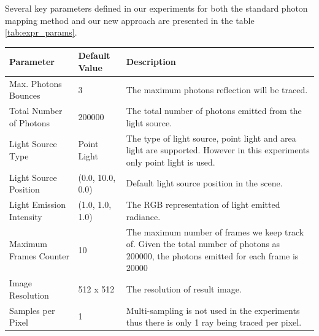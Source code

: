 Several key parameters defined in our experiments for both the standard photon mapping method and our new approach are presented in the table \ref{tab:expr_params}.

\begin{table}[Ht]
\begin{center}
	
	\renewcommand{\arraystretch}{1.2}
	\begin{tabular}{p{5cm}p{3cm}p{5cm}}
	
	Parameter  				& 		Default Value 		&		Description \\
	
	\hline

	Max. Photons Bounces		& 		3					&		The maximum photons reflection will be traced. \\

	\hline 					

	Total Number of Photons 	& 		200000				&		The total number of photons emitted from the light 																	source. \\

	\hline

	Light Source Type			& 		Point Light			& 		The type of light source, point light and area light
																are supported. However in this experiments only point 																	light is used. \\
	
	\hline
	
	Light Source Position 		& 	 	(0.0, 10.0, 0.0)		&		Default light source position in the scene. \\


	\hline
	
	Light Emission Intensity	&		(1.0, 1.0, 1.0)		&		The RGB representation of light emitted radiance.\\

	\hline

	Maximum Frames Counter 	& 		10 					& 		The maximum number of frames we keep track of. Given 																	the total number of photons as 200000, the photons 																	emitted for each frame is 20000\\

	\hline
	
	Image Resolution 			&		512 x 512				&		The resolution of result image. \\

	\hline
	
	Samples per Pixel			& 		1 					& 		Multi-sampling is not used in the experiments thus 																	there is only 1 ray being traced per pixel.\\
	

\end{tabular}
\end{center}
\end{table}
